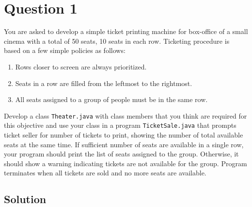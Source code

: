 \documentclass[12pt,letterpaper,twoside]{article}
\begin{document}


\section*{Question 1}

You are asked to develop a simple ticket printing machine for box-office of a small cinema with a total of 50 seats, 10 seats in each row.
Ticketing procedure is based on a few simple policies as follows:

\begin{enumerate}[itemsep=-2mm,label={}]
	\item Rows closer to screen are always prioritized.
	\item Seats in a row are filled from the leftmost to the rightmost.
	\item All seats assigned to a group of people must be in the same row.
\end{enumerate}

Develop a class \texttt{Theater.java} with class members that you think are required for this objective and use your class in a program \texttt{TicketSale.java} that prompts ticket seller for number of tickets to print, showing the number of total available seats at the same time.
If sufficient number of seats are available in a single row, your program should print the list of seats assigned to the group.
Otherwise, it should show a warning indicating tickets are not available for the group.
Program terminates when all tickets are sold and no more seats are available.

\subsection*{Solution}
\end{document}
